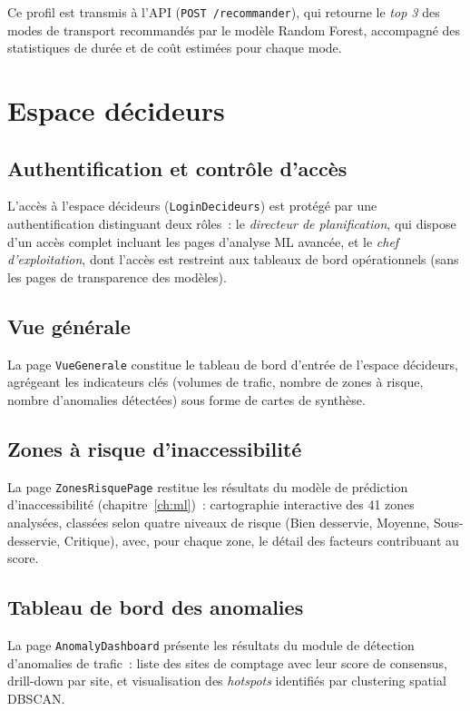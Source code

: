 Ce profil est transmis à l'API (\texttt{POST /recommander}), qui retourne le \emph{top 3} des modes de transport recommandés par le modèle Random Forest, accompagné des statistiques de durée et de coût estimées pour chaque mode.

\section{Espace décideurs}

\subsection{Authentification et contrôle d'accès}
L'accès à l'espace décideurs (\texttt{LoginDecideurs}) est protégé par une authentification distinguant deux rôles~: le \emph{directeur de planification}, qui dispose d'un accès complet incluant les pages d'analyse ML avancée, et le \emph{chef d'exploitation}, dont l'accès est restreint aux tableaux de bord opérationnels (sans les pages de transparence des modèles).

\subsection{Vue générale}
La page \texttt{VueGenerale} constitue le tableau de bord d'entrée de l'espace décideurs, agrégeant les indicateurs clés (volumes de trafic, nombre de zones à risque, nombre d'anomalies détectées) sous forme de cartes de synthèse.

\subsection{Zones à risque d'inaccessibilité}
La page \texttt{ZonesRisquePage} restitue les résultats du modèle de prédiction d'inaccessibilité (chapitre~\ref{ch:ml})~: cartographie interactive des 41 zones analysées, classées selon quatre niveaux de risque (Bien desservie, Moyenne, Sous-desservie, Critique), avec, pour chaque zone, le détail des facteurs contribuant au score.

\subsection{Tableau de bord des anomalies}
La page \texttt{AnomalyDashboard} présente les résultats du module de détection d'anomalies de trafic~: liste des sites de comptage avec leur score de consensus, drill-down par site, et visualisation des \emph{hotspots} identifiés par clustering spatial DBSCAN.

